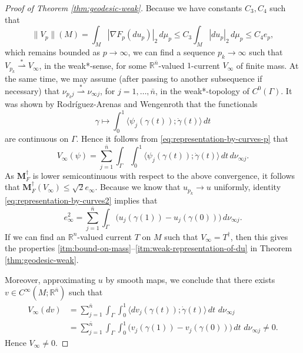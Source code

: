 \documentclass[10pt,a4paper]{amsart}
\newcommand{\R}{\mathbb{R}}
\newcommand{\M}{\mathbf{M}}
\newcommand{\ndim}{{\bar{n}}}
\newcommand{\pairing}[2]{\langle #1; #2 \rangle}
\begin{document}
\begin{proof}[Proof of Theorem \ref{thm:geodesic-weak}]
Because we have constants $C_3, C_4$ such that
\[
\|V_p\|(M) = \int_M |\nabla F_p(du_p)|_2 \, d\mu_p \le C_3 \int_M |du_p|_2 \, d\mu_p \le C_4 e_p,
\]
which remains bounded as $p \to \infty$, we can find a sequence $p_k \to \infty$ such that $V_{p_k} \stackrel{*}{\rightharpoonup} V_\infty$, in the weak*-sense, for
some $\R^\ndim$-valued $1$-current $V_\infty$ of finite mass. At the same time, we may assume (after passing to another subsequence if necessary) that $\nu_{p_k j} \stackrel{*}{\rightharpoonup} \nu_{\infty j}$, for $j = 1, \dotsc, \ndim$, in the weak*-topology of $C^0(\Gamma)$. It was shown by Rodr\'iguez-Arenas and Wengenroth \cite{Rodriguez-Arenas-Wengenroth:24} that the functionals
\[
\gamma \mapsto \int_0^1 \pairing{\psi_j(\gamma(t))}{\dot{\gamma}(t)} \, dt
\]
are continuous on $\Gamma$. Hence it follows from \eqref{eq:representation-by-curves-p} that
\[
V_\infty(\psi) = \sum_{j = 1}^\ndim \int_\Gamma \int_0^1 \pairing{\psi_j(\gamma(t))}{\dot{\gamma}(t)} \, dt \, d\nu_{\infty j}.
\]
As $\M_F^\dagger$ is lower semicontinuous with respect to the above convergence, it follows that $\M_F^\dagger(V_\infty) \le \sqrt{2} e_\infty$.
Because we know that $u_{p_k} \to u$ uniformly, identity \eqref{eq:representation-by-curves2} implies that
\[
e_\infty^2 = \sum_{j = 1}^\ndim \int_\Gamma \bigl(u_j(\gamma(1)) - u_j(\gamma(0))\bigr) \, d\nu_{\infty j}.
\]
If we can find an $\R^n$-valued current $T$ on $M$ such that $V_\infty = T^\dagger$, then this gives the properties \ref{itm:bound-on-mass}--\ref{itm:weak-representation-of-du} in Theorem \ref{thm:geodesic-weak}.

Moreover, approximating $u$ by smooth maps, we conclude that there exists
$v \in C^\infty(M; \R^\ndim)$ such that
\[
\begin{split}
V_\infty(dv) & = \sum_{j = 1}^\ndim \int_\Gamma \int_0^1 \pairing{dv_j(\gamma(t))}{\dot{\gamma}(t)} \, dt \, \, d\nu_{\infty j} \\
& = \sum_{j = 1}^\ndim \int_\Gamma \int_0^1 \bigl(v_j(\gamma(1)) - v_j(\gamma(0))\bigr) \, dt \, \, d\nu_{\infty j} \neq 0.
\end{split}
\]
Hence $V_\infty \neq 0$.


\end{proof}
\end{document}
